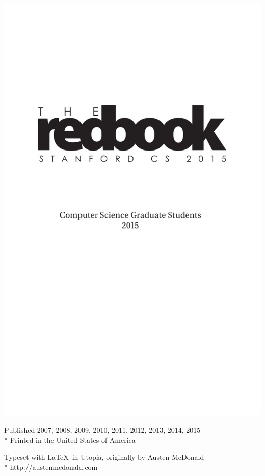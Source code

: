\documentclass[10pt]{book}
\newenvironment{fullpage}{%
  \begin{list}{}{%
    \setlength{\topmargin}{-1in}
    \setlength{\textheight}{8in}
    \setlength{\topsep}{0pt}%
    \setlength{\leftmargin}{-.6in}%
    \setlength{\listparindent}{\parindent}%
    \setlength{\itemindent}{\parindent}%
    \setlength{\parsep}{\parskip}%
  }%
  \item[]}{\end{list}}
\begin{document}
\thispagestyle{empty}
\mbox{}
\newpage

\thispagestyle{empty}
\begin{fullpage}
\includegraphics{2015-redbook-titlepage.pdf}
\end{fullpage}
\vfil\eject

\vspace*{5in}
{\small
\noindent Published 2007, 2008, 2009, 2010, 2011, 2012, 2013, 2014, 2015\\*
Printed in the United States of America

\noindent Typeset with \LaTeX\ in Utopia, originally by Austen McDonald\\*
http://austenmcdonald.com
}
\thispagestyle{empty}
\vfil\eject
\end{document}
